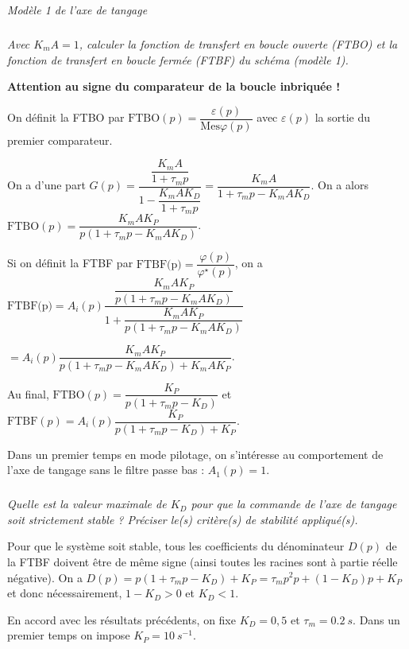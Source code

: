 \begin{multicols}{2}
\begin{center}
\textit{Modèle 1 de l’axe de tangage}
\end{center}

\fi

\subparagraph{}
\textit{Avec $K_m A = 1$, calculer la fonction de transfert en boucle ouverte (FTBO) et la fonction de transfert
en boucle fermée (FTBF) du schéma (modèle 1).}
\ifprof
\begin{corrige}
\textbf{Attention au signe du comparateur de la boucle inbriquée !}

On définit la FTBO par $\text{FTBO}(p)=\dfrac{\varepsilon(p)}{\text{Mes}\varphi(p)}$ avec $\varepsilon(p)$ la sortie du premier comparateur.

On a d'une part $G(p)=\dfrac{\dfrac{K_m A}{1+\tau_m p}}{1-\dfrac{K_m A K_D }{1+\tau_m p}}= \dfrac{K_m A}{1+\tau_m p-K_m A K_D }$.
On a alors $\text{FTBO}(p)=\dfrac{K_m A K_P}{p\left(1+\tau_m p-K_m A K_D \right)}$. 

Si on définit la FTBF par $\text{FTBF(p)}=\dfrac{\varphi(p)}{\varphi^{\star}(p)}$, on a 
$\text{FTBF(p)}=A_i(p)\dfrac{\dfrac{K_m A K_P}{p\left(1+\tau_m p-K_m A K_D \right)}}{1+\dfrac{K_m A K_P}{p\left(1+\tau_m p-K_m A K_D \right)}}$ 

$=A_i(p)\dfrac{K_m A K_P}{p\left(1+\tau_m p-K_m A K_D \right)+K_m A K_P}$.

Au final, 
$\text{FTBO}(p)=\dfrac{ K_P}{p\left(1+\tau_m p-K_D \right)}$ et 
$\text{FTBF}(p)=A_i(p)\dfrac{K_P}{p\left(1+\tau_m p- K_D \right)+K_P}$.
\end{corrige}
\else
\fi

Dans un premier temps en mode pilotage, on s’intéresse au comportement de l’axe de tangage sans le filtre passe bas :
$A_1(p)=1$.

\subparagraph{}
\textit{Quelle est la valeur maximale de $K_D$ pour que la commande de l’axe de tangage soit strictement
stable ? Préciser le(s) critère(s) de stabilité appliqué(s).}
\ifprof
\begin{corrige}
Pour que le système soit stable, tous les coefficients du dénominateur $D(p)$ de la FTBF doivent être de même signe (ainsi toutes les racines sont à partie réelle négative). On a 
$D(p)=p\left(1+\tau_m p- K_D \right)+K_P = \tau_m p^2 p+ \left(1-K_D \right)p +K_P$ et donc nécessairement, 
$1-K_D >0$ et $K_D < 1$.
\end{corrige}
\else
\fi

\ifprof
\else
En accord avec les résultats précédents, on fixe $K_D = 0,5$ et $\tau_m = \SI{0,2}{s}$.
Dans un premier temps on impose $K_P = \SI{10}{s^{-1}}$.
\fi
%
%



\end{multicols}
